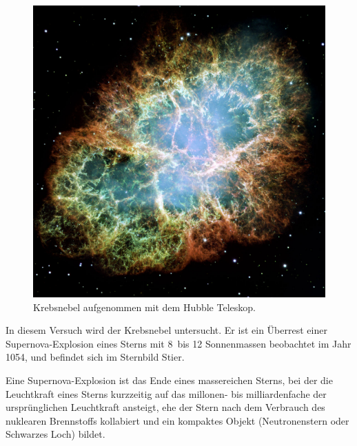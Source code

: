 \begin{figure}
		\includegraphics[width=\linewidth]{pictures/crab.jpg}
		\caption{Krebsnebel aufgenommen mit dem Hubble Teleskop.}%
    \label{fig:crab}
\end{figure}

In diesem Versuch wird der Krebsnebel untersucht.
Er ist ein Überrest einer Supernova-Explosion eines Sterns
mit 8~bis 12 Sonnenmassen beobachtet im Jahr 1054,
und befindet sich im Sternbild Stier.

Eine Supernova-Explosion ist das Ende eines massereichen Sterns,
bei der die Leuchtkraft eines Sterns kurzzeitig auf das millonen- bis
milliardenfache der ursprünglichen Leuchtkraft ansteigt,
ehe der Stern nach dem Verbrauch des
nuklearen Brennstoffs kollabiert und ein kompaktes Objekt
(Neutronenstern oder Schwarzes Loch) bildet.

